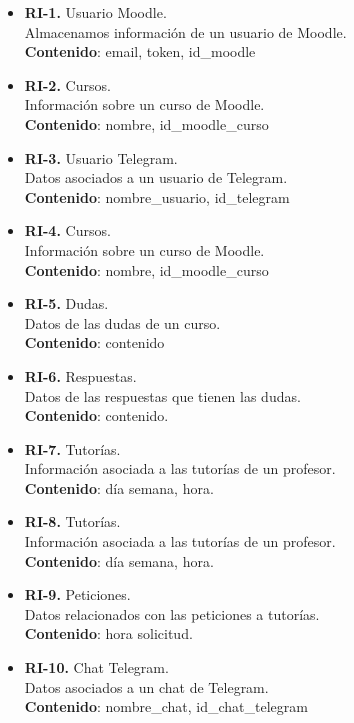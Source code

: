 \begin{itemize}
\item \textbf{RI-1.} Usuario Moodle.\\
Almacenamos información de un usuario  de Moodle.\\
\textbf{Contenido}: email, token, id\_moodle
\item \textbf{RI-2.} Cursos.\\
Información sobre un curso de Moodle.
\\
\textbf{Contenido}: nombre, id\_moodle\_curso
\item \textbf{RI-3.} Usuario Telegram.\\
Datos asociados a un usuario de Telegram.
\\
\textbf{Contenido}: nombre\_usuario, id\_telegram
\item \textbf{RI-4.} Cursos.\\
Información sobre un curso de Moodle.
\\
\textbf{Contenido}: nombre, id\_moodle\_curso
\item \textbf{RI-5.} Dudas.\\
Datos de las dudas de un curso.
\\
\textbf{Contenido}: contenido
\item \textbf{RI-6.} Respuestas.\\
Datos de las respuestas que tienen las dudas.
\\
\textbf{Contenido}: contenido.
\item \textbf{RI-7.} Tutorías.\\
Información asociada a las tutorías de un profesor.
\\
\textbf{Contenido}: día semana, hora.
\item \textbf{RI-8.} Tutorías.\\
Información asociada a las tutorías de un profesor.
\\
\textbf{Contenido}: día semana, hora.

\item \textbf{RI-9.} Peticiones.\\
Datos relacionados con las peticiones a tutorías.
\\
\textbf{Contenido}: hora solicitud.
\item \textbf{RI-10.} Chat Telegram.\\
Datos asociados a un chat de Telegram.
\\
\textbf{Contenido}: nombre\_chat, id\_chat\_telegram

\end{itemize}


